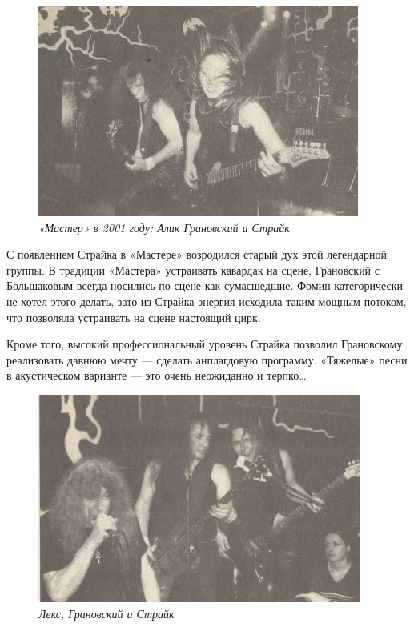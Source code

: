 \documentclass[16pt,a5paper,oneside]{book}
\begin{document}
\begin{figure}
    \centering
    \includegraphics[scale=0.9]{Image34}
    \caption{\textit{«Мастер» в 2001 году: Алик Грановский и Страйк}}
\end{figure}

С появлением Страйка в «Мастере» возродился старый дух этой легендарной группы. В традиции «Мастера» устраивать кавардак
на сцене, Грановский с Большаковым всегда носились по сцене как сумасшедшие. Фомин категорически не хотел этого делать,
зато из Страйка энергия исходила таким мощным потоком, что позволяла устраивать на сцене настоящий цирк.

Кроме того, высокий профессиональный уровень Страйка позволил Грановскому реализовать давнюю мечту — сделать анплагдовую
программу. «Тяжелые» песни в акустическом варианте — это очень неожиданно и терпко\ldots

\begin{figure}
    \centering
    \includegraphics[scale=0.9]{Image35}
    \caption{\textit{Лекс, Грановский и Страйк}}
\end{figure}
\end{document}
